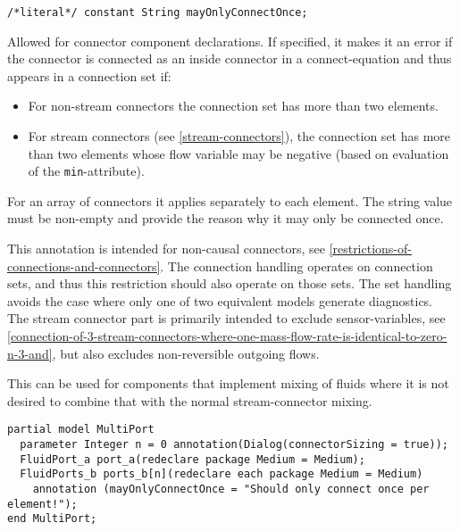 \begin{annotationdefinition}[mayOnlyConnectOnce]
\begin{synopsis}\begin{lstlisting}
/*literal*/ constant String mayOnlyConnectOnce;
\end{lstlisting}\end{synopsis}
\begin{semantics}
Allowed for connector component declarations.
If specified, it makes it an error if the connector is connected as an inside connector in a connect-equation and thus appears in a connection set if:
\begin{itemize}
\item For non-stream connectors the connection set has more than two elements.
\item For stream connectors (see \cref{stream-connectors}), the connection set has more than two elements whose flow variable may be negative (based on evaluation of the \lstinline!min!-attribute).
\end{itemize}
For an array of connectors it applies separately to each element.
The string value must be non-empty and provide the reason why it may only be connected once.

\begin{nonnormative}
This annotation is intended for non-causal connectors, see \cref{restrictions-of-connections-and-connectors}.
The connection handling operates on connection sets, and thus this restriction should also operate on those sets.
The set handling avoids the case where only one of two equivalent models generate diagnostics.
The stream connector part is primarily intended to exclude sensor-variables, see \cref{connection-of-3-stream-connectors-where-one-mass-flow-rate-is-identical-to-zero-n-3-and}, but also excludes non-reversible outgoing flows.
\end{nonnormative}

\begin{example}
This can be used for components that implement mixing of fluids where it is not desired to combine that with the normal stream-connector mixing.
\begin{lstlisting}[language=modelica]
partial model MultiPort
  parameter Integer n = 0 annotation(Dialog(connectorSizing = true));
  FluidPort_a port_a(redeclare package Medium = Medium);
  FluidPorts_b ports_b[n](redeclare each package Medium = Medium)
    annotation (mayOnlyConnectOnce = "Should only connect once per element!");
end MultiPort;
\end{lstlisting}
\end{example}
\end{semantics}
\end{annotationdefinition}


